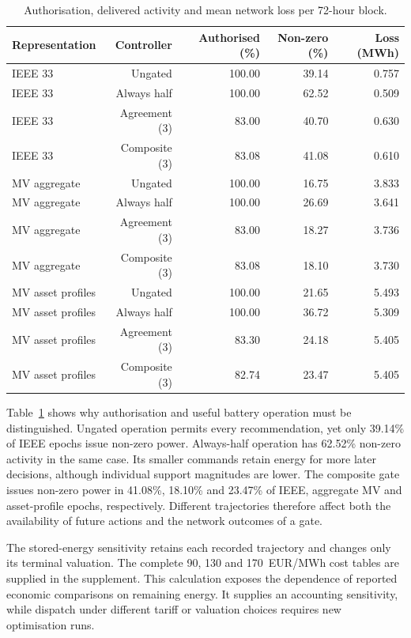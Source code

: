 \documentclass[preprint,12pt]{elsarticle}
\begin{document}
\begin{table}[tbp]
\centering\small\setlength{\tabcolsep}{3.5pt}
\caption{Authorisation, delivered activity and mean network loss per 72-hour block.}\label{tab:activity}
\begin{tabular}{lrrrr}
\toprule
Representation & Controller & Authorised (\%) & Non-zero (\%) & Loss (MWh)\\\midrule
IEEE 33 & Ungated & 100.00 & 39.14 & 0.757\\
IEEE 33 & Always half & 100.00 & 62.52 & 0.509\\
IEEE 33 & Agreement (3) & 83.00 & 40.70 & 0.630\\
IEEE 33 & Composite (3) & 83.08 & 41.08 & 0.610\\
MV aggregate & Ungated & 100.00 & 16.75 & 3.833\\
MV aggregate & Always half & 100.00 & 26.69 & 3.641\\
MV aggregate & Agreement (3) & 83.00 & 18.27 & 3.736\\
MV aggregate & Composite (3) & 83.08 & 18.10 & 3.730\\
MV asset profiles & Ungated & 100.00 & 21.65 & 5.493\\
MV asset profiles & Always half & 100.00 & 36.72 & 5.309\\
MV asset profiles & Agreement (3) & 83.30 & 24.18 & 5.405\\
MV asset profiles & Composite (3) & 82.74 & 23.47 & 5.405\\
\bottomrule\end{tabular}
\end{table}
Table~\ref{tab:activity} shows why authorisation and useful battery operation must be distinguished. Ungated operation permits every recommendation, yet only 39.14\% of IEEE epochs issue non-zero power. Always-half operation has 62.52\% non-zero activity in the same case. Its smaller commands retain energy for more later decisions, although individual support magnitudes are lower. The composite gate issues non-zero power in 41.08\%, 18.10\% and 23.47\% of IEEE, aggregate MV and asset-profile epochs, respectively. Different trajectories therefore affect both the availability of future actions and the network outcomes of a gate.

The stored-energy sensitivity retains each recorded trajectory and changes only its terminal valuation. The complete 90, 130 and 170~EUR/MWh cost tables are supplied in the supplement. This calculation exposes the dependence of reported economic comparisons on remaining energy. It supplies an accounting sensitivity, while dispatch under different tariff or valuation choices requires new optimisation runs.
\end{document}
